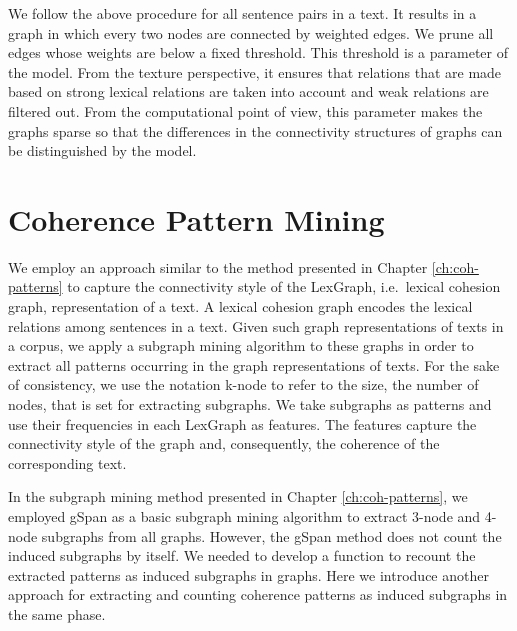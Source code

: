 We follow the above procedure for all sentence pairs in a text. 
It results in a graph in which every two nodes are connected by weighted edges.    
We prune all edges whose weights are below a fixed threshold. 
This threshold is a parameter of the model.
From the texture perspective, it ensures that relations that are made based on strong lexical relations are taken into account and weak relations are filtered out. 
From the computational point of view, this parameter makes the graphs sparse so that the differences in the connectivity structures of graphs can be distinguished by the model. 

\section{Coherence Pattern Mining}
\label{sec:lex-graph-pattern-mining}

We employ an approach similar to the method presented in Chapter \ref{ch:coh-patterns} to capture the connectivity style of the LexGraph, i.e.\ lexical cohesion graph, representation of a text. 
A lexical cohesion graph encodes the lexical relations among sentences in a text. 
Given such graph representations of texts in a corpus, we apply a subgraph mining algorithm to these graphs in order to extract all patterns occurring in the graph representations of texts.  
For the sake of consistency, we use the notation k-node to refer to the size, the number of nodes, that is set for extracting subgraphs. 
We take subgraphs as patterns and use their frequencies in each LexGraph as features.  
The features capture the connectivity style of the graph and, consequently, the coherence of the corresponding text.   

In the subgraph mining method presented in Chapter \ref{ch:coh-patterns}, we employed gSpan as a basic subgraph mining algorithm to extract 3-node and 4-node subgraphs from all graphs. 
However, the gSpan method does not count the induced subgraphs by itself. 
We needed to develop a function to recount the extracted patterns as induced subgraphs in graphs.  
Here we introduce another approach for extracting and counting coherence patterns as induced subgraphs in the same phase.  

